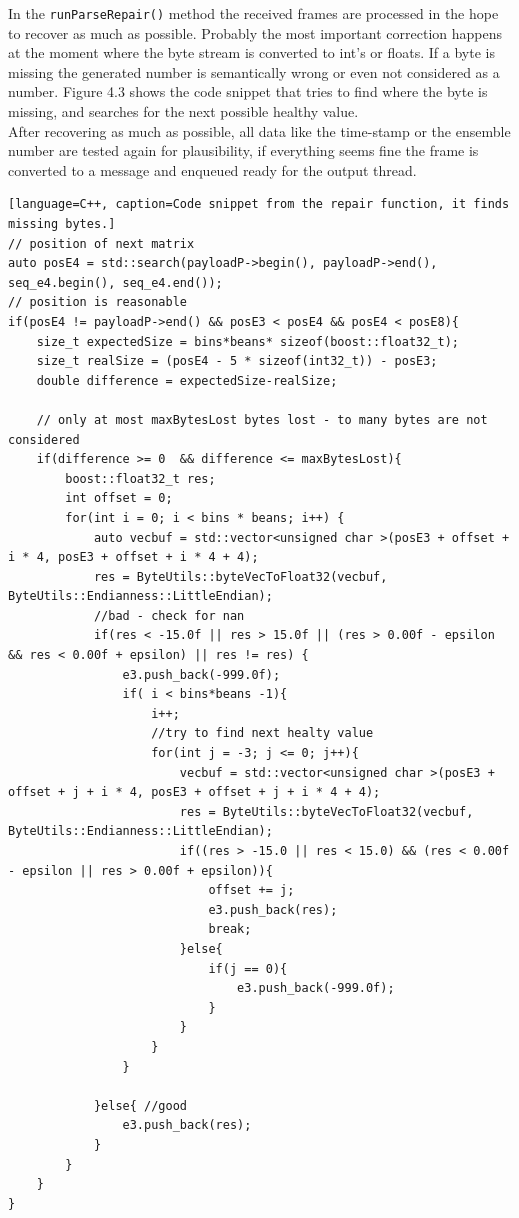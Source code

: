 In the \texttt{runParseRepair()} method the received frames are processed in the hope to recover as much as possible. Probably the most important correction happens at the moment where the byte stream is converted to int's or floats. If a byte is missing the generated number is semantically wrong or even not considered as a number. Figure 4.3 shows the code snippet that tries to find where the byte is missing, and searches for the next possible healthy value.\\
After recovering as much as possible, all data like the time-stamp or the ensemble number are tested again for plausibility, if everything seems fine the frame is converted to a message and enqueued ready for the output thread.
\begin{lstlisting}[language=C++, caption=Code snippet from the repair function, it finds missing bytes.]
// position of next matrix
auto posE4 = std::search(payloadP->begin(), payloadP->end(), seq_e4.begin(), seq_e4.end());
// position is reasonable
if(posE4 != payloadP->end() && posE3 < posE4 && posE4 < posE8){
    size_t expectedSize = bins*beans* sizeof(boost::float32_t);
    size_t realSize = (posE4 - 5 * sizeof(int32_t)) - posE3;
    double difference = expectedSize-realSize;

    // only at most maxBytesLost bytes lost - to many bytes are not considered
    if(difference >= 0  && difference <= maxBytesLost){
        boost::float32_t res;
        int offset = 0;
        for(int i = 0; i < bins * beans; i++) {
            auto vecbuf = std::vector<unsigned char >(posE3 + offset + i * 4, posE3 + offset + i * 4 + 4);
            res = ByteUtils::byteVecToFloat32(vecbuf, ByteUtils::Endianness::LittleEndian);
            //bad - check for nan
            if(res < -15.0f || res > 15.0f || (res > 0.00f - epsilon && res < 0.00f + epsilon) || res != res) {
                e3.push_back(-999.0f);
                if( i < bins*beans -1){
                    i++;
                    //try to find next healty value
                    for(int j = -3; j <= 0; j++){
                        vecbuf = std::vector<unsigned char >(posE3 + offset + j + i * 4, posE3 + offset + j + i * 4 + 4);
                        res = ByteUtils::byteVecToFloat32(vecbuf, ByteUtils::Endianness::LittleEndian);
                        if((res > -15.0 || res < 15.0) && (res < 0.00f - epsilon || res > 0.00f + epsilon)){
                            offset += j;
                            e3.push_back(res);
                            break;
                        }else{
                            if(j == 0){
                                e3.push_back(-999.0f);
                            }
                        }
                    }
                }

            }else{ //good
                e3.push_back(res);
            }
        }
    }
}
\end{lstlisting}

